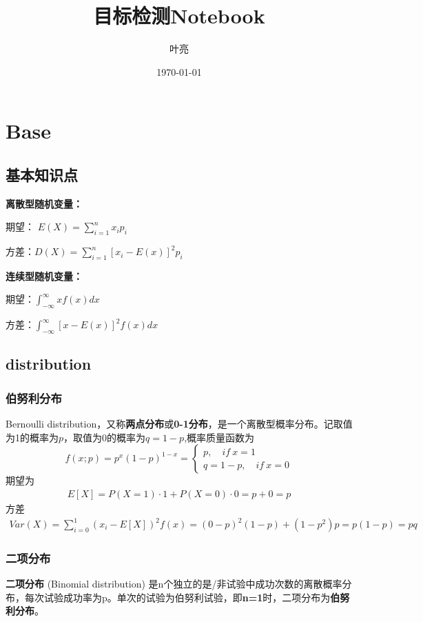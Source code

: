 \documentclass{article}
\title{目标检测Notebook}
\author{叶亮}
\date{\today}
\begin{document}
 
\maketitle
\tableofcontents

\section{Base}

\subsection{基本知识点}
\textbf{离散型随机变量：}

期望： $E(X) = \sum_{i=1}^n{x_i p_i}$

方差：$D(X) = \sum_{i=1}^n{[x_i - E(x)]^2 p_i}$

\textbf{连续型随机变量：}

期望：$\int_{-\infty}^\infty{x f(x) dx}$

方差：$\int_{-\infty}^\infty{[x-E(x)]^2 f(x) dx}$

\subsection{distribution}
\subsubsection{伯努利分布}
Bernoulli distribution，又称\textbf{两点分布}或\textbf{0-1分布}，是一个离散型概率分布。记取值为1的概率为$p$，取值为0的概率为$q=1-p$,概率质量函数为
\begin{equation}
f(x;p) =  p^x(1-p)^{1-x} =  \begin{cases}
	p, \quad if\ x=1 \\
	q = 1 - p, \quad if\ x =0
	\end{cases}
\end{equation}
期望为
\begin{align}
E[X] = P(X=1)\cdot 1 + P(X=0) \cdot 0 = p  + 0 = p
\end{align}
方差
\begin{align}
Var(X) = \sum_{i=0}^1(x_i - E[X])^2 f(x) = (0 - p)^2(1-p) + (1-p^2)p = p(1-p) = pq
\end{align}

\subsubsection{二项分布}
\textbf{二项分布}	(Binomial distribution) 是n个独立的是/非试验中成功次数的离散概率分布，每次试验成功率为p。单次的试验为伯努利试验，即\textbf{n=1}时，二项分布为\textbf{伯努利分布}。
\end{document}

